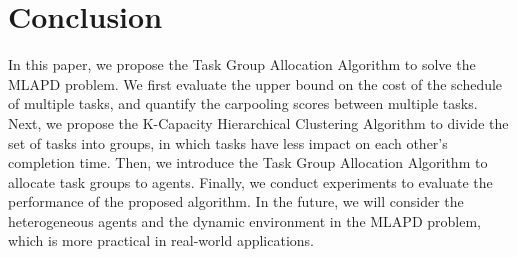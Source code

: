 \documentclass[sigconf,anonymous]{aamas}
\begin{document}

\section{Conclusion}
\label{sec:conclusion}

In this paper, we propose the Task Group Allocation Algorithm to solve the MLAPD problem.
We first evaluate the upper bound on the cost of the schedule of multiple tasks,
and quantify the carpooling scores between multiple tasks.
Next, we propose the K-Capacity Hierarchical Clustering Algorithm to divide the set of tasks into groups,
in which tasks have less impact on each other's completion time.
Then, we introduce the Task Group Allocation Algorithm to allocate task groups to agents.
Finally, we conduct experiments to evaluate the performance of the proposed algorithm.
In the future, we will consider
the heterogeneous agents and the dynamic environment in the MLAPD problem,
which is more practical in real-world applications.

\balance


 
\end{document}
